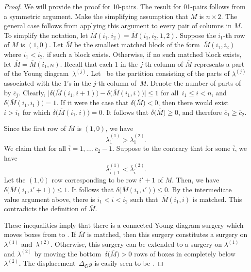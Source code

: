 \documentclass[pdftex]{sigma}
\numberwithin{equation}{section}
\newcommand{\surgery}{\mathfrak S}
\begin{document}
\begin{proof}
We will provide the proof for 10-pairs. The result for 01-pairs follows from a symmetric argument. Make the simplifying assumption that $M$ is $n\times 2$. The general case follows from applying this argument to every pair of columns in $M$. To simplify the notation, let $\overline{M}(i_1, i_2) = \overline{M}(i_1, i_2, 1, 2)$.
Suppose the $i_1$-th row of $M$ is $(1, 0)$. Let $\overline M$ be the smallest matched block of the form~$\overline{M}(i_1, i_2)$ where $i_1 < i_2$, if such a block exists. Otherwise, if no such matched block exists, let $\overline M = \overline{M}(i_1, n)$. Recall that each 1 in the $j$-th column of $\overline M$ represents a part of the Young diagram~$\lambda^{(j)}$. Let~ be the partition consisting of the parts of $\lambda^{(j)}$ associated with the 1's in the $j$-th column of~$\overline M$. Denote the number of parts of  by $\overline{c}_j$. Clearly, $\big|\delta\bigl(\overline{M}(i_1, i + 1)\bigr) - \delta\bigl(\overline{M}(i_1, i)\bigr)\big| \leq 1$ for all~${i_1 \leq i < n}$, and $\delta\bigl(\overline{M}(i_1, i_1)\bigr) = 1$. If it were the case that $\delta\bigl(\overline M\bigr) < 0$, then there would exist~${i > i_1}$ for which $\delta\bigl(\overline{M}(i_1, i)\bigr) = 0$. It follows that $\delta\bigl(\overline M\bigr) \geq 0$, and therefore $\overline{c}_1 \geq \overline{c}_2$.

Since the first row of $\overline M$ is $(1, 0)$, we have
\[
\overline{\lambda}^{(1)}_1 > \overline{\lambda}^{(2)}_1.
\]
 We claim that  for all $\overline{i}=1, \dots , \overline{c}_2 - 1$. Suppose to the contrary that for some $\overline{i}$, we have
\[
\overline{\lambda}^{(1)}_{\overline{i}+1} < \overline{\lambda}^{(2)}_{\overline{i}}.
\] Let the $(1, 0)$ row corresponding to  be row $i'+1$ of $M$. Then, we have
$\delta\bigl(\overline{M}(i_1, i' + 1)\bigr) \leq 1$. It follows that $\delta\bigl(\overline{M}(i_1, i')\bigr) \leq 0$. By the intermediate value argument above, there is $i_1 < i < i_2$ such that~${\overline{M}(i_1, i)}$ is matched. This contradicts the definition of $\overline M$.

These inequalities imply that there is a connected Young diagram surgery which moves  boxes from  to . If $\overline M$ is matched, then this surgery constitutes a surgery on $\lambda^{(1)}$ and~$\lambda^{(2)}$. Otherwise, this surgery can be extended to a surgery on $\lambda^{(1)}$ and $\lambda^{(2)}$ by moving the bottom~${\delta\bigl(\overline{M}\bigr) >0} $ rows of boxes in  completely below $\lambda^{(2)}$. The displacement~$\Delta_\surgery y$ is easily seen to be .
\end{proof}
\end{document}

